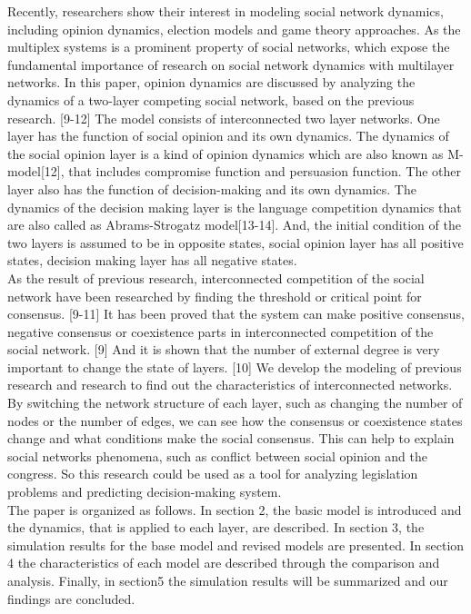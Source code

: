 \documentclass[english]{cccconf}
\begin{document}
Recently, researchers show their interest in modeling social network dynamics, including opinion dynamics, election models and game theory approaches. As the multiplex systems is a prominent property of social networks, which expose the fundamental importance of research on social network dynamics with multilayer networks.  In this paper, opinion dynamics are discussed by analyzing the dynamics of a two-layer competing social network, based on the previous research. [9-12] The model consists of interconnected two layer networks. One layer has the function of social opinion and its own dynamics. The dynamics of the social opinion layer is a kind of opinion dynamics which are also known as M-model[12], that includes compromise function and persuasion function. The other layer also has the function of decision-making and its own dynamics. The dynamics of the decision making layer is the language competition dynamics that are also called as Abrams-Strogatz model[13-14]. And, the initial condition of the two layers is assumed to be in opposite states, social opinion layer has all positive states, decision making layer has all negative states.\\
As the result of previous research, interconnected competition of the social network have been researched by finding the threshold or critical point for consensus. [9-11] It has been proved that the system can make positive consensus, negative consensus or coexistence parts in interconnected competition of the social network. [9] And it is shown that the number of external degree is very important to change the state of layers. [10] We develop the modeling of previous research and research to find out the characteristics of interconnected networks. By switching the network structure of each layer, such as changing the number of nodes or the number of edges, we can see how the consensus or coexistence states change and what conditions make the social consensus. This can help to explain social networks phenomena, such as conflict between social opinion and the congress. So this research could be used as a tool for analyzing legislation problems and predicting decision-making system. \\
The paper is organized as follows. In section 2, the basic model is introduced and the dynamics, that is applied to each layer, are described.  In section 3, the simulation results for the base model and revised models are presented. In section 4 the characteristics of each model are described through the comparison and analysis. Finally, in section5 the simulation results will be summarized and our findings are concluded.
\end{document}
